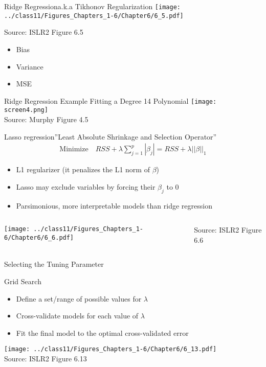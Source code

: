 \documentclass[ignorenonframetext,xcolor=x11names]{beamer}
\begin{document}
\begin{frame}{Ridge Regression}{a.k.a Tikhonov Regularization}
\texttt{[image: ../class11/Figures\_Chapters\_1-6/Chapter6/6\_5.pdf]}

\scriptsize Source: ISLR2 Figure 6.5 \normalsize \\

\begin{itemize}
  \item Bias
  \item \color{teal}Variance
  \item \color{magenta}MSE
\end{itemize}

\end{frame}

\begin{frame}{Ridge Regression Example }{Fitting a Degree 14 Polynomial}
\centering
\texttt{[image: screen4.png]}\\
\scriptsize Source: Murphy Figure 4.5
\end{frame}

\begin{frame}{Lasso regression}{''Least Absolute Shrinkage and Selection Operator''}
\begin{align*}
\text{Minimize} \quad RSS + \lambda \sum_{j=1}^p |\beta_j| = RSS + \lambda ||\beta||_1
\end{align*}
\begin{itemize}
   \item L1 regularizer (it penalizes the L1 norm of $\beta$)
   \item Lasso may exclude variables by forcing their $\beta_j$ to 0
   \item Parsimonious, more interpretable models than ridge regression
\end{itemize}
\begin{columns}
\begin{column}{0.8\textwidth}
\texttt{[image: ../class11/Figures\_Chapters\_1-6/Chapter6/6\_6.pdf]}
\end{column}
\begin{column}{0.2\textwidth}
\scriptsize Source: ISLR2 Figure 6.6
\end{column}
\end{columns}
\end{frame}

\begin{frame}{Selecting the Tuning Parameter}
\begin{block}{Grid Search}
\begin{itemize} 
   \item Define a set/range of possible values for $\lambda$
   \item Cross-validate models for each value of $\lambda$
   \item Fit the final model to the optimal cross-validated error
\end{itemize}
\end{block}
\centering
\texttt{[image: ../class11/Figures\_Chapters\_1-6/Chapter6/6\_13.pdf]} \\

\scriptsize Source: ISLR2 Figure 6.13
\end{frame}
\end{document}

